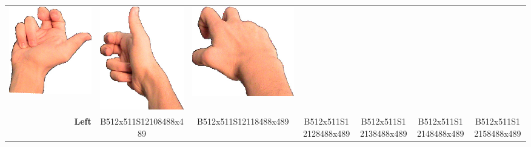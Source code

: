 \documentclass{article}
\begin{document}
\begin{center}
\begin{tabular}{r*{6}{c}}
\includegraphics[scale=0.1]{images/03-02-4.jpg}&
\includegraphics[scale=0.1]{images/03-02-5.jpg}&
\includegraphics[scale=0.1]{images/03-02-6.jpg}\\
\textbf{Left}&
B512x511S12108488x489&
B512x511S12118488x489&
B512x511S12128488x489&
B512x511S12138488x489&
B512x511S12148488x489&
B512x511S12158488x489\\
\end{tabular}
\end{center}
\end{document}
